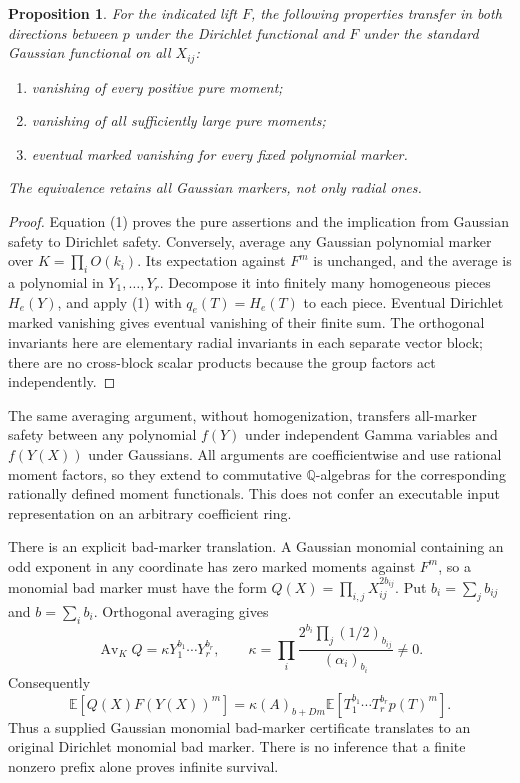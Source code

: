 \documentclass[11pt]{article}
\newtheorem{proposition}{Proposition}
\newcommand{\E}{\mathbb E}
\begin{document}
\begin{proposition}
For the indicated lift $F$, the following properties transfer in both
directions between $p$ under the Dirichlet functional and $F$ under the
standard Gaussian functional on all $X_{ij}$:
\begin{enumerate}
\item vanishing of every positive pure moment;
\item vanishing of all sufficiently large pure moments;
\item eventual marked vanishing for every fixed polynomial marker.
\end{enumerate}
The equivalence retains \emph{all} Gaussian markers, not only radial ones.
\end{proposition}
\begin{proof}
Equation (1) proves the pure assertions and the implication from Gaussian
safety to Dirichlet safety. Conversely, average any Gaussian polynomial
marker over $K=\prod_iO(k_i)$. Its expectation against $F^m$ is unchanged,
and the average is a polynomial in $Y_1,\ldots,Y_r$. Decompose it into
finitely many homogeneous pieces $H_e(Y)$, and apply (1) with
$q_e(T)=H_e(T)$ to each piece. Eventual Dirichlet marked vanishing gives
eventual vanishing of their finite sum. The orthogonal invariants here
are elementary radial invariants in each separate vector block; there
are no cross-block scalar products because the group factors act
independently.
\end{proof}

The same averaging argument, without homogenization, transfers all-marker
safety between any polynomial $f(Y)$ under independent Gamma variables
and $f(Y(X))$ under Gaussians. All arguments are coefficientwise and use
rational moment factors, so they extend to commutative $\mathbb Q$-algebras
for the corresponding rationally defined moment functionals. This does
not confer an executable input representation on an arbitrary coefficient ring.

There is an explicit bad-marker translation. A Gaussian monomial containing
an odd exponent in any coordinate has zero marked moments against $F^m$,
so a monomial bad marker must have the form
$Q(X)=\prod_{i,j}X_{ij}^{2b_{ij}}$. Put
$b_i=\sum_j b_{ij}$ and $b=\sum_i b_i$. Orthogonal averaging gives
\[
 \operatorname{Av}_K Q=\kappa Y_1^{b_1}\cdots Y_r^{b_r},\qquad
 \kappa=\prod_i
 \frac{2^{b_i}\prod_j(1/2)_{b_{ij}}}{(\alpha_i)_{b_i}}\ne0.
\]
Consequently
\[
 \E[Q(X)F(Y(X))^m]
   =\kappa(A)_{b+Dm}\E[T_1^{b_1}\cdots T_r^{b_r}p(T)^m].       \tag{2}
\]
Thus a supplied Gaussian monomial bad-marker certificate translates to
an original Dirichlet monomial bad marker. There is no inference that a
finite nonzero prefix alone proves infinite survival.
\end{document}
